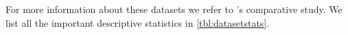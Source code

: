 \documentclass[./../../paper.tex]{subfiles}
\begin{document}
\noindent For more information about these datasets we refer to \citeauthor{teinemaa_OutcomeOrientedPredictiveProcess_2018a}'s comparative study\autocite{teinemaa_OutcomeOrientedPredictiveProcess_2018a}. We list all the important descriptive statistics in \autoref{tbl:datasetstats}.


\end{document}
